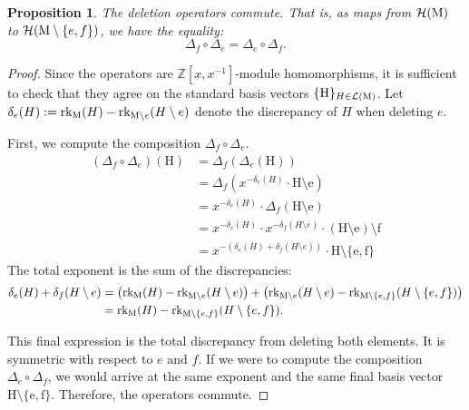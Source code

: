 \documentclass[11pt]{article}
\newcommand{\calH}{\mathcal{H}}
\newcommand{\rank}{\normalfont\text{rk}}
\newcommand{\M}{\normalfont\text{M}}
\newcommand{\ZZ}{\mathbb{Z}}
\newcommand{\Ebasis}[1]{\mathrm{#1}}
\newtheorem{proposition}[theorem]{Proposition}
\theoremstyle{remark}
\begin{document}
\begin{proposition}\label{prop:delta_commutes}
    The deletion operators commute. That is, as maps from \(\calH(\M)\) to \(\calH(\M \setminus \{e,f\})\), we have the equality:
    \[ \Delta_f \circ \Delta_e = \Delta_e \circ \Delta_f. \]
\end{proposition}
\begin{proof}
    Since the operators are \(\ZZ[x, x^{-1}]\)-module homomorphisms,
    it is sufficient to check that they agree on the standard basis vectors
    \(\{\Ebasis{H}\}_{H \in \mathcal{L}(\M)}\). Let
    \(\delta_e(H) := \rank_{\M}(H) - \rank_{\M\setminus e}(H\setminus e)\) denote the discrepancy of \(H\)
    when deleting \(e\).

    First, we compute the composition \(\Delta_f \circ \Delta_e\).
    \begin{align*}
        (\Delta_f \circ \Delta_e)(\Ebasis{H}) & = \Delta_f \left( \Delta_e(\Ebasis{H}) \right)                                                   \\
                                              & = \Delta_f \left( x^{-\delta_e(H)} \cdot \Ebasis{H \setminus e} \right)                          \\
                                              & = x^{-\delta_e(H)} \cdot \Delta_f(\Ebasis{H \setminus e})                                        \\
                                              & = x^{-\delta_e(H)} \cdot x^{-\delta_f(H \setminus e)} \cdot \Ebasis{(H \setminus e) \setminus f} \\
                                              & = x^{-(\delta_e(H) + \delta_f(H \setminus e))} \cdot \Ebasis{H \setminus \{e,f\}}
    \end{align*}
    The total exponent is the sum of the discrepancies:
    \begin{align*}
        \delta_e(H) + \delta_f(H \setminus e) & = \left( \rank_{\M}(H) - \rank_{\M\setminus e}(H\setminus e) \right)
        + \left( \rank_{\M\setminus e}(H\setminus e) - \rank_{\M\setminus\{e,f\}}(H\setminus\{e,f\}) \right)         \\
                                              & = \rank_{\M}(H) - \rank_{\M\setminus\{e,f\}}(H\setminus\{e,f\}).
    \end{align*}

    This final expression is the total discrepancy from deleting both elements. It is symmetric with respect to \(e\) and \(f\). If we were to compute the composition \(\Delta_e \circ \Delta_f\), we would arrive at the same exponent and the same final basis vector \(\Ebasis{H \setminus \{e,f\}}\). Therefore, the operators commute.
\end{proof}
\end{document}

